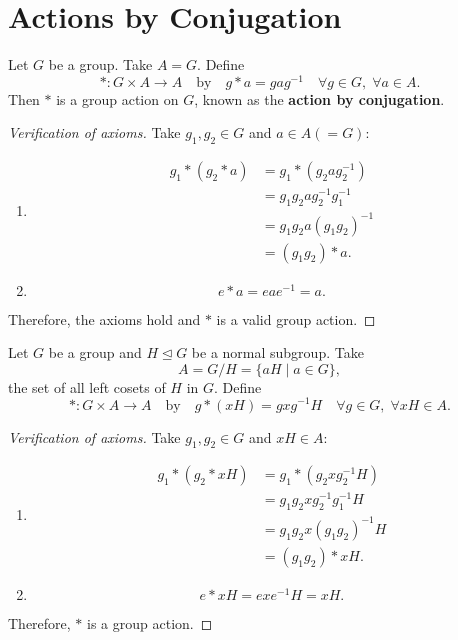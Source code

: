 \section{Actions by Conjugation}

\begin{example}
Let $G$ be a group. Take $A = G$. Define
\[
* : G \times A \longrightarrow A \quad \text{by} \quad g * a = gag^{-1} \quad \forall g \in G, \; \forall a \in A.
\]
Then $*$ is a group action on $G$, known as the \textbf{action by conjugation}.
\begin{proof}[Verification of axioms]
Take $g_1, g_2 \in G$ and $a \in A (= G)$:
\begin{enumerate}[label=(\roman*)]
    \item 
    \begin{align*}
    g_1 * (g_2 * a) &= g_1 * (g_2 a g_2^{-1}) \\
    &= g_1 g_2 a g_2^{-1} g_1^{-1} \\
    &= g_1 g_2 a (g_1 g_2)^{-1} \\
    &= (g_1 g_2) * a.
    \end{align*}
    \item 
    \[
    e * a = eae^{-1} = a.
    \]
\end{enumerate}
Therefore, the axioms hold and $*$ is a valid group action.
\end{proof}
\end{example}

\begin{example}
Let $G$ be a group and $H \trianglelefteq G$ be a normal subgroup. Take
\[
A = G/H = \{aH \mid a \in G\},
\]
the set of all left cosets of $H$ in $G$. Define
\[
* : G \times A \longrightarrow A \quad \text{by} \quad g * (xH) = gxg^{-1}H \quad \forall g \in G, \; \forall xH \in A.
\]
\begin{proof}[Verification of axioms]
Take $g_1, g_2 \in G$ and $xH \in A$:
\begin{enumerate}[label=(\roman*)]
    \item 
    \begin{align*}
    g_1 * (g_2 * xH) &= g_1 * (g_2 x g_2^{-1}H) \\
    &= g_1 g_2 x g_2^{-1} g_1^{-1}H \\
    &= g_1 g_2 x (g_1 g_2)^{-1}H \\
    &= (g_1 g_2) * xH.
    \end{align*}
    \item 
    \[
    e * xH = exe^{-1}H = xH.
    \]
\end{enumerate}
Therefore, $*$ is a group action.
\end{proof}
\end{example}

